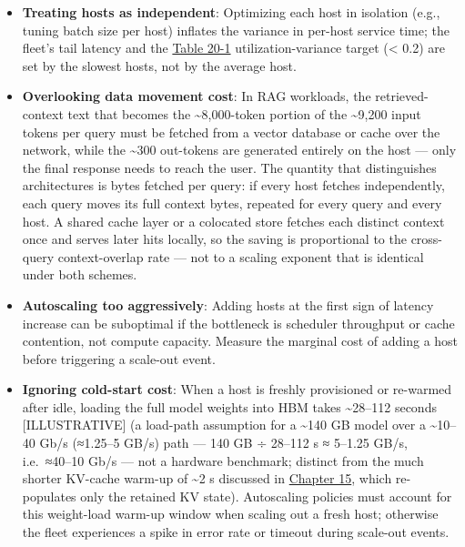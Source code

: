 \begin{itemize}
\item
  \textbf{Treating hosts as independent}: Optimizing each host in
  isolation (e.g., tuning batch size per host) inflates the variance in
  per-host service time; the fleet's tail latency and the \hyperref[tab:20.1]{Table 20-1}
  utilization-variance target (\textless{} 0.2) are set by the slowest
  hosts, not by the average host.
\item
  \textbf{Overlooking data movement cost}: In RAG workloads, the
  retrieved-context text that becomes the \textasciitilde8,000-token
  portion of the \textasciitilde9,200 input tokens per query must be
  fetched from a vector database or cache over the network, while the
  \textasciitilde300 out-tokens are generated entirely on the host ---
  only the final response needs to reach the user. The quantity that
  distinguishes architectures is bytes fetched per query: if every host
  fetches independently, each query moves its full context bytes,
  repeated for every query and every host. A shared cache layer or a
  colocated store fetches each distinct context once and serves later
  hits locally, so the saving is proportional to the cross-query
  context-overlap rate --- not to a scaling exponent that is identical
  under both schemes.
\item
  \textbf{Autoscaling too aggressively}: Adding hosts at the first sign
  of latency increase can be suboptimal if the bottleneck is scheduler
  throughput or cache contention, not compute capacity. Measure the
  marginal cost of adding a host before triggering a scale-out event.
\item
  \textbf{Ignoring cold-start cost}: When a host is freshly provisioned
  or re-warmed after idle, loading the full model weights into HBM takes
  \textasciitilde28--112 seconds \mbox{{[}ILLUSTRATIVE{]}} (a load-path
  assumption for a \textasciitilde140 GB model over a
  \textasciitilde10--40 Gb/s (≈1.25--5 GB/s) path --- 140 GB ÷ 28--112 s
  ≈ 5--1.25 GB/s, i.e.~≈40--10 Gb/s --- not a hardware benchmark;
  distinct from the much shorter KV-cache warm-up of \textasciitilde2 s
  discussed in \hyperref[chap:15]{Chapter 15}, which re-populates only the retained KV
  state). Autoscaling policies must account for this weight-load warm-up
  window when scaling out a fresh host; otherwise the fleet experiences
  a spike in error rate or timeout during scale-out events.
\end{itemize}

\label{architecture-consequence}


